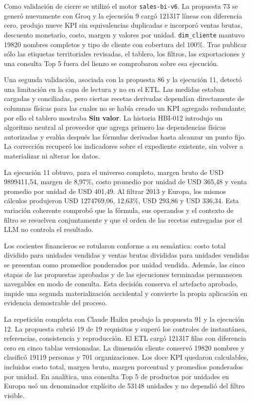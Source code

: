 \documentclass[11pt,letterpaper]{article}
\newcommand{\file}[1]{\texttt{#1}}
\begin{document}
Como validación de cierre se utilizó el motor \file{sales-bi-v6}. La propuesta 73 se generó nuevamente con Groq y la ejecución 9 cargó 121317 líneas con diferencia cero, produjo nueve KPI sin equivalencias duplicadas e incorporó ventas brutas, descuento monetario, costo, margen y valores por unidad. \file{dim\_cliente} mantuvo 19820 nombres completos y tipo de cliente con cobertura del 100\%. Tras publicar sólo las etiquetas territoriales revisadas, el tablero, los filtros, las exportaciones y una consulta Top 5 fuera del lienzo se comprobaron sobre esa ejecución.

Una segunda validación, asociada con la propuesta 86 y la ejecución 11, detectó una limitación en la capa de lectura y no en el ETL. Las medidas estaban cargadas y conciliadas, pero ciertas recetas derivadas dependían directamente de columnas físicas para las cuales no se había creado un KPI agregado redundante; por ello el tablero mostraba \textbf{Sin valor}. La historia HBI-012 introdujo un algoritmo neutral al proveedor que agrega primero las dependencias físicas autorizadas y evalúa después las fórmulas derivadas hasta alcanzar un punto fijo. La corrección recuperó los indicadores sobre el expediente existente, sin volver a materializar ni alterar los datos.

La ejecución 11 obtuvo, para el universo completo, margen bruto de USD 9899411,54, margen de 8,97\%, costo promedio por unidad de USD 365,48 y venta promedio por unidad de USD 401,49. Al filtrar 2013 y Europa, los mismos cálculos produjeron USD 1274769,06, 12,63\%, USD 293,86 y USD 336,34. Esta variación coherente comprobó que la fórmula, sus operandos y el contexto de filtro se resuelven conjuntamente y que el orden de las recetas entregadas por el LLM no controla el resultado.

Los cocientes financieros se rotularon conforme a su semántica: costo total dividido para unidades vendidas y ventas brutas divididas para unidades vendidas se presentan como promedios ponderados por unidad vendida. Además, las cinco etapas de las propuestas aprobadas y de las ejecuciones terminadas permanecen navegables en modo de consulta. Esta decisión conserva el artefacto aprobado, impide una segunda materialización accidental y convierte la propia aplicación en evidencia demostrable del proceso.

La repetición completa con Claude Haiku produjo la propuesta 91 y la ejecución 12. La propuesta cubrió 19 de 19 requisitos y superó los controles de instantánea, referencias, consistencia y reproducción. El ETL cargó 121317 filas con diferencia cero en cinco tablas versionadas. La dimensión cliente conservó 19820 nombres y clasificó 19119 personas y 701 organizaciones. Los doce KPI quedaron calculables, incluidos costo total, margen bruto, margen porcentual y promedios ponderados por unidad. En analítica, una consulta Top 5 de productos por unidades en Europa usó un denominador explícito de 53148 unidades y no dependió del filtro visible.
\end{document}
